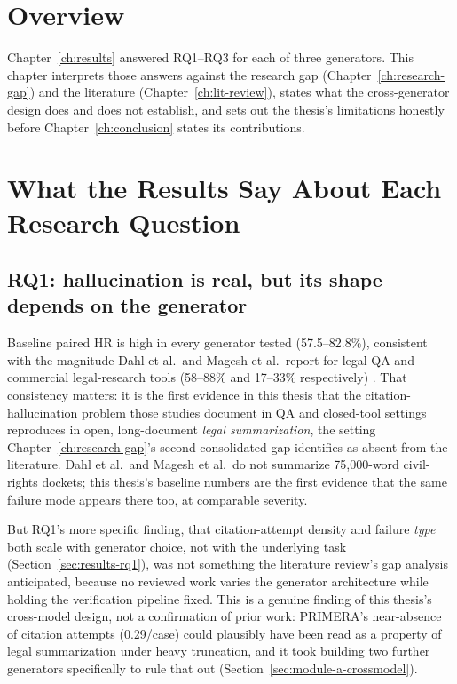 \label{ch:discussion}

\section{Overview}
\label{sec:disc-overview}

Chapter~\ref{ch:results} answered RQ1--RQ3 for each of three generators. This chapter interprets those answers against the research gap (Chapter~\ref{ch:research-gap}) and the literature (Chapter~\ref{ch:lit-review}), states what the cross-generator design does and does not establish, and sets out the thesis's limitations honestly before Chapter~\ref{ch:conclusion} states its contributions.

\section{What the Results Say About Each Research Question}
\label{sec:disc-rqs}

\subsection{RQ1: hallucination is real, but its shape depends on the generator}
\label{sec:disc-rq1}

Baseline paired HR is high in every generator tested (57.5--82.8\%), consistent with the magnitude Dahl et al.\ and Magesh et al.\ report for legal QA and commercial legal-research tools (58--88\% and 17--33\% respectively) \cite{dahl2024largelegalfictions,magesh2025hallucinationfree}. That consistency matters: it is the first evidence in this thesis that the citation-hallucination problem those studies document in QA and closed-tool settings reproduces in open, long-document \emph{legal summarization}, the setting Chapter~\ref{ch:research-gap}'s second consolidated gap identifies as absent from the literature. Dahl et al.\ and Magesh et al.\ do not summarize 75,000-word civil-rights dockets; this thesis's baseline numbers are the first evidence that the same failure mode appears there too, at comparable severity.

But RQ1's more specific finding, that citation-attempt density and failure \emph{type} both scale with generator choice, not with the underlying task (Section~\ref{sec:results-rq1}), was not something the literature review's gap analysis anticipated, because no reviewed work varies the generator architecture while holding the verification pipeline fixed. This is a genuine finding of this thesis's cross-model design, not a confirmation of prior work: PRIMERA's near-absence of citation attempts (0.29/case) could plausibly have been read as a property of legal summarization under heavy truncation, and it took building two further generators specifically to rule that out (Section~\ref{sec:module-a-crossmodel}).

